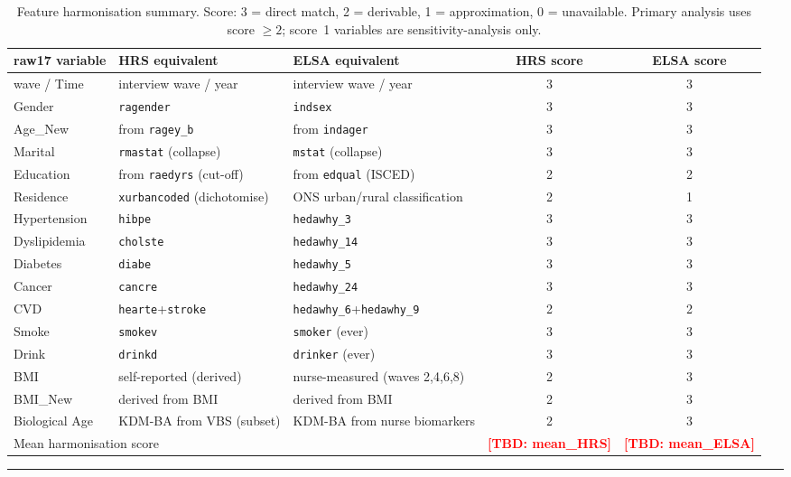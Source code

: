 \documentclass[11pt,a4paper]{article}
\newcommand{\TBD}[1]{\textcolor{red}{\textbf{[TBD: #1]}}}
\begin{document}
\begin{table}[h!]
\centering
\small
\caption{Feature harmonisation summary. Score: 3 = direct match, 2 = derivable, 1 = approximation, 0 = unavailable. Primary analysis uses score $\geq 2$; score~1 variables are sensitivity-analysis only.}
\label{tab:harmonisation}
\begin{tabular}{lp{3.5cm}p{3.5cm}cc}
\toprule
raw17 variable & HRS equivalent & ELSA equivalent & HRS score & ELSA score \\
\midrule
wave / Time & interview wave / year & interview wave / year & 3 & 3 \\
Gender & \texttt{ragender} & \texttt{indsex} & 3 & 3 \\
Age\_New & from \texttt{ragey\_b} & from \texttt{indager} & 3 & 3 \\
Marital & \texttt{rmastat} (collapse) & \texttt{mstat} (collapse) & 3 & 3 \\
Education & from \texttt{raedyrs} (cut-off) & from \texttt{edqual} (ISCED) & 2 & 2 \\
Residence & \texttt{xurbancoded} (dichotomise) & ONS urban/rural classification & 2 & 1 \\
Hypertension & \texttt{hibpe} & \texttt{hedawhy\_3} & 3 & 3 \\
Dyslipidemia & \texttt{cholste} & \texttt{hedawhy\_14} & 3 & 3 \\
Diabetes & \texttt{diabe} & \texttt{hedawhy\_5} & 3 & 3 \\
Cancer & \texttt{cancre} & \texttt{hedawhy\_24} & 3 & 3 \\
CVD & \texttt{hearte}+\texttt{stroke} & \texttt{hedawhy\_6}+\texttt{hedawhy\_9} & 2 & 2 \\
Smoke & \texttt{smokev} & \texttt{smoker} (ever) & 3 & 3 \\
Drink & \texttt{drinkd} & \texttt{drinker} (ever) & 3 & 3 \\
BMI & self-reported (derived) & nurse-measured (waves 2,4,6,8) & 2 & 3 \\
BMI\_New & derived from BMI & derived from BMI & 2 & 3 \\
Biological Age & KDM-BA from VBS (subset) & KDM-BA from nurse biomarkers & 2 & 3 \\
\midrule
\multicolumn{3}{l}{Mean harmonisation score} & \TBD{mean\_HRS} & \TBD{mean\_ELSA} \\
\bottomrule
\end{tabular}
\end{table}

\vspace{8pt}
\hrule
\end{document}
